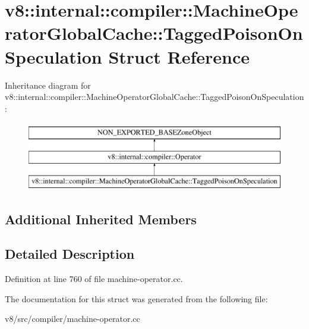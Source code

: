 \hypertarget{structv8_1_1internal_1_1compiler_1_1MachineOperatorGlobalCache_1_1TaggedPoisonOnSpeculation}{}\section{v8\+:\+:internal\+:\+:compiler\+:\+:Machine\+Operator\+Global\+Cache\+:\+:Tagged\+Poison\+On\+Speculation Struct Reference}
\label{structv8_1_1internal_1_1compiler_1_1MachineOperatorGlobalCache_1_1TaggedPoisonOnSpeculation}
Inheritance diagram for v8\+:\+:internal\+:\+:compiler\+:\+:Machine\+Operator\+Global\+Cache\+:\+:Tagged\+Poison\+On\+Speculation\+:\begin{figure}[H]
\begin{center}
\leavevmode
\includegraphics[height=3.000000cm]{structv8_1_1internal_1_1compiler_1_1MachineOperatorGlobalCache_1_1TaggedPoisonOnSpeculation}
\end{center}
\end{figure}
\subsection*{Additional Inherited Members}


\subsection{Detailed Description}


Definition at line 760 of file machine-\/operator.\+cc.



The documentation for this struct was generated from the following file\+:\begin{DoxyCompactItemize}
\item 
v8/src/compiler/machine-\/operator.\+cc\end{DoxyCompactItemize}
